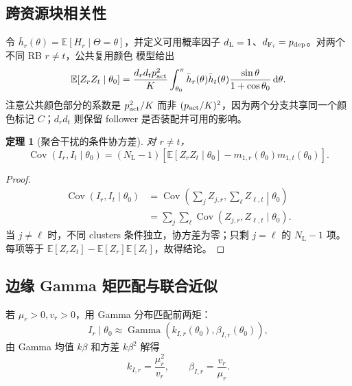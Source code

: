 \documentclass[UTF8,a4paper,11pt]{ctexart}
\newtheorem{theorem}{定理}[section]
\newcommand{\E}{\mathbb E}
\newcommand{\Cov}{\operatorname{Cov}}
\newcommand{\dd}{\,\mathrm d}
\newcommand{\NL}{N_{\mathrm L}}
\begin{document}
\subsection{跨资源块相关性}

令 $\bar h_r(\theta)=\E[H_r\mid\Theta=\theta]$，并定义可用概率因子
$d_{\rm L}=1$、$d_{{\rm F}_i}=p_{\rm dep}$。对两个不同 RB $r\neq t$，公共复用颜色
模型给出
\begin{equation}
 \E[Z_rZ_t\mid\theta_0]
 =
 \frac{d_rd_t p_{\rm act}^2}{K}
 \int_{\theta_0}^{\pi}
 \bar h_r(\theta)\bar h_t(\theta)
 \frac{\sin\theta}{1+\cos\theta_0}\dd\theta.
 \label{eq:cross-raw-moment}
\end{equation}
注意公共颜色部分的系数是 $p_{\rm act}^2/K$ 而非
$(p_{\rm act}/K)^2$，因为两个分支共享同一个颜色标记 $C$；$d_rd_t$ 则保留 follower
是否装配并可用的影响。

\begin{theorem}[聚合干扰的条件协方差]
对 $r\neq t$，
\begin{equation}
 \Cov(I_r,I_t\mid\theta_0)
 =
 (\NL-1)
 \left[
 \E[Z_rZ_t\mid\theta_0]
 -m_{1,r}(\theta_0)m_{1,t}(\theta_0)
 \right].
 \label{eq:aggregate-covariance}
\end{equation}
\end{theorem}

\begin{proof}
\begin{equation}
\begin{split}
 \Cov(I_r,I_t\mid\theta_0)
 &=
 \Cov\left(\sum_jZ_{j,r},\sum_\ell Z_{\ell,t}\middle|\theta_0\right)\\
 &=
 \sum_j\sum_\ell
 \Cov(Z_{j,r},Z_{\ell,t}\mid\theta_0).
\end{split}
\end{equation}
当 $j\neq\ell$ 时，不同 clusters 条件独立，协方差为零；只剩 $j=\ell$ 的 $\NL-1$
项。每项等于 $\E[Z_rZ_t]-\E[Z_r]\E[Z_t]$，故得结论。
\end{proof}

\subsection{边缘 Gamma 矩匹配与联合近似}

若 $\mu_r>0,v_r>0$，用 Gamma 分布匹配前两矩：
\begin{equation}
 I_r\mid\theta_0
 \approx\operatorname{Gamma}
 \left(
 k_{I,r}(\theta_0),\beta_{I,r}(\theta_0)
 \right),
 \label{eq:interference-gamma}
\end{equation}
由 Gamma 均值 $k\beta$ 和方差 $k\beta^2$ 解得
\begin{equation}
 k_{I,r}=\frac{\mu_r^2}{v_r},
 \qquad
 \beta_{I,r}=\frac{v_r}{\mu_r}.
 \label{eq:moment-match}
\end{equation}
\end{document}
